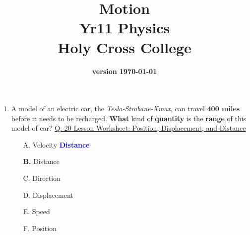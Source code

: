 \documentclass[A4,12pt]{article}
\begin{document}
\title{\Huge Motion\\
\large{Yr11 Physics\\Holy Cross College}}
\date{\bf version \today\currenttime}
\maketitle






\begin{enumerate}[label=\bfseries (\arabic*)]


\section*{\textcolor{red}{Position, distance and displacement:}}










\item A model of an electric car, the \textit{Tesla-Strabane-Xmax}, can travel \textbf{400 miles} before it needs to be recharged. \textbf{What} kind of \textbf{quantity} is the \textbf{range} of this model of car? \cite{Nagwa} \href{https://www.nagwa.com/en/worksheets/530139601254/}{Q. 20 Lesson Worksheet: Position, Displacement, and Distance}
%
\begin{multicols}{2}
\begin{itemize}
    \item[A.] Velocity
    \textcolor{blue}{\bf Distance}
    \item[\bf B.] Distance
    \item[C.] Direction
    \item[D.] Displacement
    \item[E.] Speed
    \item[F.] Position
\end{itemize}
\end{multicols}









\end{enumerate}
\end{document}
